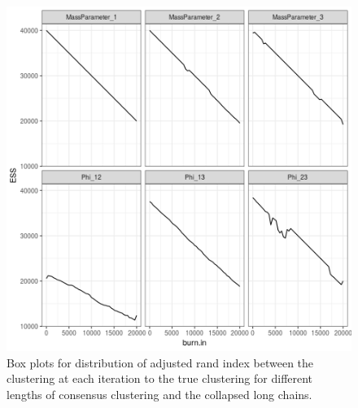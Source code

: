 \documentclass[12pt]{article} %
\begin{document}
\newpage

\begin{figure}[h]
	\centering
	\includegraphics[scale=0.65]{Images/Gen_data/Case_1/Esimated_burn_in_plot_7.png}
	\caption{Box plots for distribution of adjusted rand index between the clustering at each iteration to the true clustering for different lengths of consensus clustering and the collapsed long chains.}
	\label{fig:case_1_esimated_burn_in_plot_7}
\end{figure}

\newpage
\end{document}
